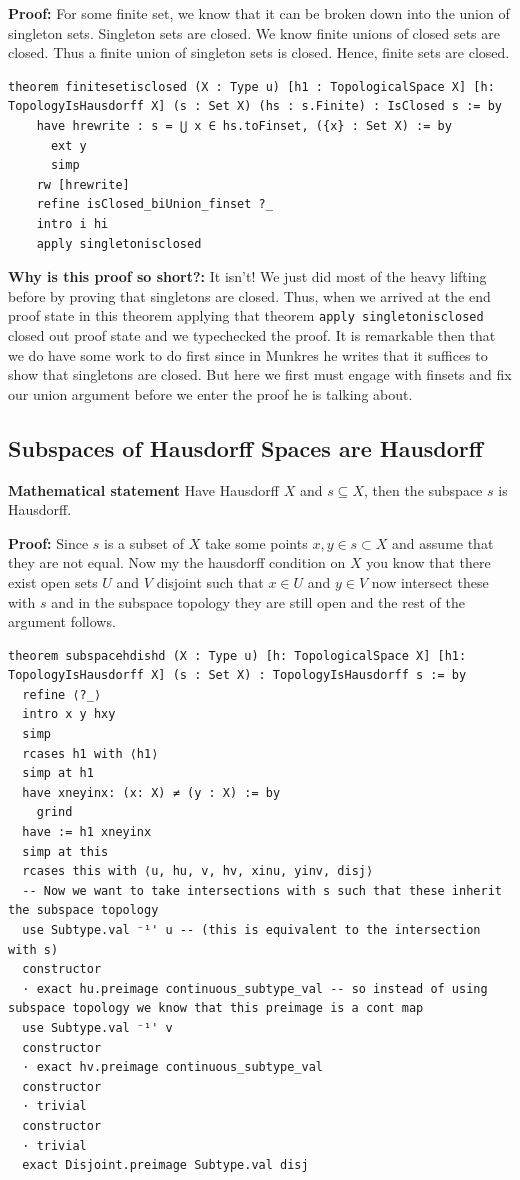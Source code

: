 \documentclass[11pt]{article}
\begin{document}
\textbf{Proof:} 
For some finite set, we know that it can be broken down into the union of singleton sets. Singleton sets are closed. We know finite unions of closed sets are closed. Thus a finite union of singleton sets is closed. Hence, finite sets are closed. 

\begin{verbatim}
theorem finitesetisclosed (X : Type u) [h1 : TopologicalSpace X] [h: TopologyIsHausdorff X] (s : Set X) (hs : s.Finite) : IsClosed s := by
    have hrewrite : s = ⋃ x ∈ hs.toFinset, ({x} : Set X) := by
      ext y
      simp
    rw [hrewrite]
    refine isClosed_biUnion_finset ?_
    intro i hi 
    apply singletonisclosed 
\end{verbatim}

\medskip
\noindent
\textbf{Why is this proof so short?:} It isn't! We just did most of the heavy lifting before by proving that singletons are closed. Thus, when we arrived at the end proof state in this theorem applying that theorem \verb|apply singletonisclosed| closed out proof state and we typechecked the proof. It is remarkable then that we do have some work to do first since in Munkres he writes that it suffices to show that singletons are closed. But here we first must engage with finsets and fix our union argument before we enter the proof he is talking about. 

\subsection{Subspaces of Hausdorff Spaces are Hausdorff}

\textbf{Mathematical statement} 
Have Hausdorff $X$  and $s\subseteq X$, then the subspace $s$ is Hausdorff.

\textbf{Proof:} 
Since $s$ is a subset of $X$ take some points $x, y \in s \subset X$ and assume that they are not equal. Now my the hausdorff condition on $X$ you know that there exist open sets $U$ and $V$ disjoint such that $x \in U$ and $y \in V$ now intersect these with $s$ and in the subspace topology they are still open and the rest of the argument follows. 


\begin{verbatim}
theorem subspacehdishd (X : Type u) [h: TopologicalSpace X] [h1: TopologyIsHausdorff X] (s : Set X) : TopologyIsHausdorff s := by
  refine ⟨?_⟩ 
  intro x y hxy
  simp 
  rcases h1 with ⟨h1⟩ 
  simp at h1
  have xneyinx: (x: X) ≠ (y : X) := by 
    grind
  have := h1 xneyinx 
  simp at this
  rcases this with ⟨u, hu, v, hv, xinu, yinv, disj⟩
  -- Now we want to take intersections with s such that these inherit the subspace topology
  use Subtype.val ⁻¹' u -- (this is equivalent to the intersection with s)
  constructor
  · exact hu.preimage continuous_subtype_val -- so instead of using subspace topology we know that this preimage is a cont map
  use Subtype.val ⁻¹' v 
  constructor
  · exact hv.preimage continuous_subtype_val 
  constructor
  · trivial
  constructor
  · trivial 
  exact Disjoint.preimage Subtype.val disj
\end{verbatim}
\end{document}
